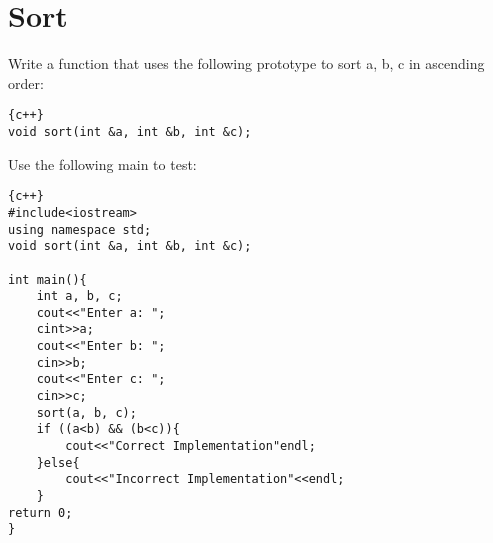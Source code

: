 \documentclass{article}
\begin{document}
\section*{Sort}
Write a function that uses the following prototype to sort a, b, c in ascending order:
\begin{lstlisting}{c++}
void sort(int &a, int &b, int &c);
\end{lstlisting}
Use the following main to test:
\begin{lstlisting}{c++}
#include<iostream>
using namespace std;
void sort(int &a, int &b, int &c);

int main(){
	int a, b, c;
	cout<<"Enter a: ";
	cint>>a;
	cout<<"Enter b: ";
	cin>>b;
	cout<<"Enter c: ";
	cin>>c;	
	sort(a, b, c);          
	if ((a<b) && (b<c)){
		cout<<"Correct Implementation"endl;
	}else{
		cout<<"Incorrect Implementation"<<endl;
	}
return 0;
}
\end{lstlisting}
\end{document}
